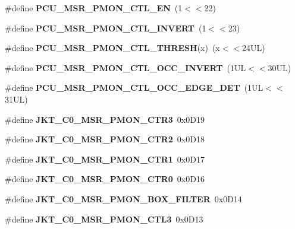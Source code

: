 \begin{DoxyCompactItemize}
\item 
\#define {\bfseries P\+C\+U\+\_\+\+M\+S\+R\+\_\+\+P\+M\+O\+N\+\_\+\+C\+T\+L\+\_\+\+E\+N}~(1$<$$<$22)\label{types_8h_a1e9aab2a6f0dbcb84d248dfbe5178f83}

\item 
\#define {\bfseries P\+C\+U\+\_\+\+M\+S\+R\+\_\+\+P\+M\+O\+N\+\_\+\+C\+T\+L\+\_\+\+I\+N\+V\+E\+R\+T}~(1$<$$<$23)\label{types_8h_a7761666c999fba919904ca732e0f8c5d}

\item 
\#define {\bfseries P\+C\+U\+\_\+\+M\+S\+R\+\_\+\+P\+M\+O\+N\+\_\+\+C\+T\+L\+\_\+\+T\+H\+R\+E\+S\+H}(x)~(x$<$$<$24\+U\+L)\label{types_8h_a043c9514bf4ca2382f229736555de524}

\item 
\#define {\bfseries P\+C\+U\+\_\+\+M\+S\+R\+\_\+\+P\+M\+O\+N\+\_\+\+C\+T\+L\+\_\+\+O\+C\+C\+\_\+\+I\+N\+V\+E\+R\+T}~(1\+U\+L$<$$<$30\+U\+L)\label{types_8h_a73449775204af16f448758ea9338aa4f}

\item 
\#define {\bfseries P\+C\+U\+\_\+\+M\+S\+R\+\_\+\+P\+M\+O\+N\+\_\+\+C\+T\+L\+\_\+\+O\+C\+C\+\_\+\+E\+D\+G\+E\+\_\+\+D\+E\+T}~(1\+U\+L$<$$<$31\+U\+L)\label{types_8h_a45022ec8dc8fcc09dfccc717e33f130d}

\item 
\#define {\bfseries J\+K\+T\+\_\+\+C0\+\_\+\+M\+S\+R\+\_\+\+P\+M\+O\+N\+\_\+\+C\+T\+R3}~0x0\+D19\label{types_8h_af453401af8ac44f2b383415605c8426b}

\item 
\#define {\bfseries J\+K\+T\+\_\+\+C0\+\_\+\+M\+S\+R\+\_\+\+P\+M\+O\+N\+\_\+\+C\+T\+R2}~0x0\+D18\label{types_8h_a1e1ffc38f7039a2fcebbda3f9b5e0cac}

\item 
\#define {\bfseries J\+K\+T\+\_\+\+C0\+\_\+\+M\+S\+R\+\_\+\+P\+M\+O\+N\+\_\+\+C\+T\+R1}~0x0\+D17\label{types_8h_a9846f58878f2706b514a1132eed4b044}

\item 
\#define {\bfseries J\+K\+T\+\_\+\+C0\+\_\+\+M\+S\+R\+\_\+\+P\+M\+O\+N\+\_\+\+C\+T\+R0}~0x0\+D16\label{types_8h_adbb2cf699abceb9d7bacab62f2360f49}

\item 
\#define {\bfseries J\+K\+T\+\_\+\+C0\+\_\+\+M\+S\+R\+\_\+\+P\+M\+O\+N\+\_\+\+B\+O\+X\+\_\+\+F\+I\+L\+T\+E\+R}~0x0\+D14\label{types_8h_a22d14f649a68e2fffc253fb7c7e41e3b}

\item 
\#define {\bfseries J\+K\+T\+\_\+\+C0\+\_\+\+M\+S\+R\+\_\+\+P\+M\+O\+N\+\_\+\+C\+T\+L3}~0x0\+D13\label{types_8h_a9978b68b4c0ca0cafefea351d0079822}


\end{DoxyCompactItemize}
